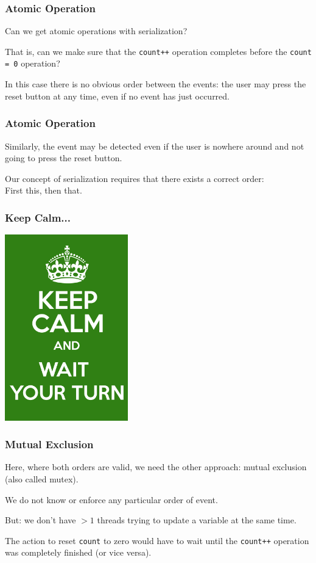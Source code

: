 \begin{frame}
	\frametitle{Atomic Operation}

	Can we get atomic operations with serialization?

	That is, can we make sure that the \texttt{count++} operation completes before the \texttt{count = 0} operation?

	In this case there is no obvious order between the events: the user may press the reset button at any time, even if no event has just occurred.
	
\end{frame}

\begin{frame}
	\frametitle{Atomic Operation}


	Similarly, the event may be detected even if the user is nowhere around and not going to press the reset button.

	Our concept of serialization requires that there exists a correct order:\\
	\quad First this, then that.


\end{frame}


\begin{frame}
	\frametitle{Keep Calm...}

	\begin{center}
		\includegraphics[width=0.4\textwidth]{images/waityourturn.png}
	\end{center}

\end{frame}


\begin{frame}
	\frametitle{Mutual Exclusion}

	Here, where both orders are valid, we need the other approach: mutual exclusion (also called \alert{mutex}).

	We do not know or enforce any particular order of event.

	But: we don't have $>1$ threads trying to update a variable at the same time.

	The action to reset \texttt{count} to zero would have to wait until the \texttt{count++} operation was completely finished (or vice versa).


\end{frame}


